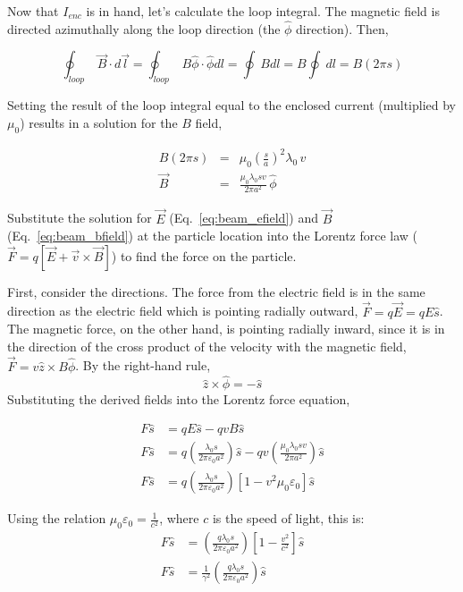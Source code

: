 \documentclass[12pt]{article}
\begin{document}
\begin{flushleft}
Now that $I_{enc}$ is in hand, let's calculate the loop integral.  The magnetic field is directed azimuthally along the loop direction (the $\hat{\phi}$ direction).  Then,

\[
\oint_{loop} \: \vec{B}\cdot d\vec{l} = \oint_{loop} \: B\hat{\phi}\cdot \hat{\phi}dl =\oint \: Bdl = B \oint \: dl = B (2\pi s)
\]

Setting the result of the loop integral equal to the enclosed current (multiplied by $\mu_{0}$) results in a solution for the $B$ field,

\begin{eqnarray}
B (2\pi s) & = & \mu_{0}\left(\frac{s}{a}\right)^{2}\lambda_{0} \, v \nonumber \\
\vec{B}  & = & \frac{\mu_{0}\lambda_{0}sv}{ 2\pi a^{2} } \, \hat{\phi} \label{eq:beam_bfield}
\end{eqnarray}

Substitute the solution for $\vec{E}$ (Eq.~\ref{eq:beam_efield}) and $\vec{B}$ (Eq.~\ref{eq:beam_bfield}) at the particle location into the Lorentz force law ($\vec{F}=q[\vec{E}+\vec{v}\times \vec{B}]$) to find the force on the particle.

First, consider the directions.  The force from the electric field is in the same direction as the electric field which is pointing radially outward, $\vec{F}=q\vec{E}=qE\hat{s}$.  The magnetic force, on the other hand, is pointing radially inward, since it is in the direction of the cross product of the velocity with the magnetic field, $\vec{F}=v\hat{z} \times B\hat{\phi}$.  By the right-hand rule,
\[
\hat{z} \times \hat{\phi} =-\hat{s}
\]
Substituting the derived fields into the Lorentz force equation,

\begin{equation*}
\begin{aligned}
F\hat{s} & =qE\hat{s}-qvB\hat{s} \\
F\hat{s} & =q\left(\frac{\lambda_{0}s}{ 2\pi \varepsilon_{0} a^{2} }\right)\hat{s}-qv\left(\frac{\mu_{0}\lambda_{0}sv}{ 2\pi a^{2} }\right) \hat{s} \\
F\hat{s} & =q\left(\frac{\lambda_{0}s}{ 2\pi \varepsilon_{0} a^{2} }\right)\left[1-v^{2}\mu_{0}\varepsilon_{0} \right] \hat{s}
\end{aligned}
\end{equation*}

Using the relation $\mu_{0}\varepsilon_{0}=\frac{1}{c^{2}}$, where $c$ is the speed of light, this is:
\begin{equation*}
\begin{aligned}
F\hat{s} & = \left( \frac{q\lambda_{0}s}{ 2\pi \varepsilon_{0} a^{2} } \right) \left[ 1-\frac{ v^{2} }{ c^{2} } \right] \hat{s}\\
F\hat{s} & = \frac{1}{\gamma^{2}}\left( \frac{q\lambda_{0}s}{ 2\pi \varepsilon_{0} a^{2} } \right) \hat{s}\\
\end{aligned}
\end{equation*}


\end{flushleft}
\end{document}
